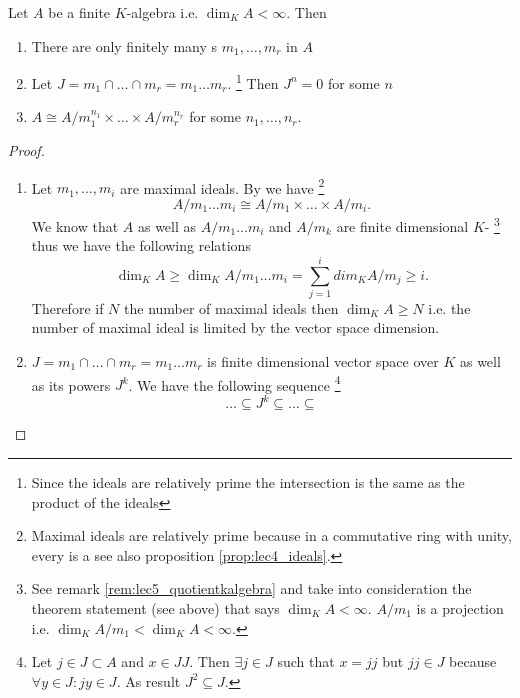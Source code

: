 \begin{theorem}
  Let $A$ be a finite $K$-algebra i.e.
  $\dim_K A < \infty$. Then
  \begin{enumerate}
  \item There are only finitely many s
    $m_1, \dots, m_r$ in $A$
  \item Let $J = m_1 \cap \dots \cap m_r = m_1 \dots m_r$.
    \footnote{
      Since the ideals are relatively prime the intersection is the
      same as the product of the ideals
    }
    Then
    $J^n = 0$ for some $n$
  \item
    $A \cong A/{m_1^{n_1}} \times \dots \times A/{m_r^{n_r}}$ for
    some $n_1, \dots, n_r$.    
  \end{enumerate}
  \begin{proof}
    \begin{enumerate}
    \item
      Let $m_1, \dots, m_i$ are maximal ideals. By
       we have
      \footnote{
        Maximal ideals are relatively prime because
        in a commutative ring with unity, every
         is a
         see also proposition
        \ref{prop:lec4_ideals}. 
      }
      \[
      A/m_1 \dots m_i \cong
      A/m_1 \times \dots \times A/m_i.
      \]
      We know that $A$ as well as $A/m_1 \dots m_i$ and $A/m_k$ are
      finite dimensional $K$-
      \footnote {
        See remark \ref{rem:lec5_quotientkalgebra} and take into
        consideration  
        the theorem statement (see above) that says 
        $\dim_K A < \infty$. $A/m_1$ is a projection i.e.
        $\dim_K A/m_1 < \dim_K A < \infty$.
      }
      thus we have the
      following relations
      \[
      \dim_K A \ge \dim_K  A/m_1 \dots m_i  =
      \sum_{j=1}^i dim_K A/m_j \ge i.
      \]
      Therefore if $N$ the number of maximal ideals then
      $\dim_K A \ge N$ i.e. the number of maximal ideal is limited by
      the vector space dimension.
    \item
      $J = m_1 \cap \dots \cap m_r = m_1 \dots m_r$ is finite
      dimensional vector space over $K$ as well as its powers
      $J^k$. We have the following sequence
      \footnote {
        Let $j \in J \subset A$ and $x \in JJ$.
        Then $\exists j \in J$ such that $x = j j$
        but $j j \in J$ because $\forall y \in J: j y \in J$.
        As result $J^2 \subseteq J$.
      }
      \[
      \dots \subseteq J^k \subseteq \dots \subseteq
\]
\end{enumerate}
\end{proof}
\end{theorem}
